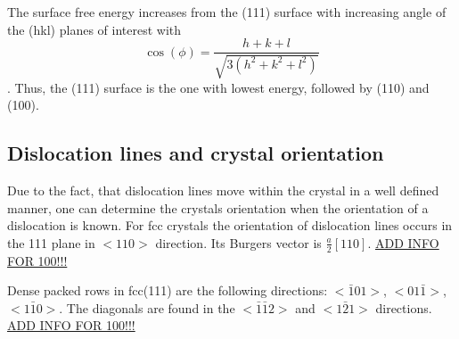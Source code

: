 The surface free energy increases from the (111) surface with increasing angle of the (hkl) planes of interest with $$\cos(\phi)=\frac{h+k+l}{\sqrt{3(h^2+k^2+l^2)}}$$ \cite{jian-min_calculation_2004}. Thus, the (111) surface is the one with lowest energy, followed by (110) and (100).

%

\subsection{Dislocation lines and crystal orientation}
Due to the fact, that dislocation lines move within the crystal in a well defined manner, one can determine the crystals orientation when the orientation of a dislocation is known.
For fcc crystals the orientation of dislocation lines occurs in the {111} plane in $<110>$ direction. Its Burgers vector is $\frac{a}{2}[110]$\cite{_dislocation-theory}. \underline{ADD INFO	FOR 100!!!}

 Dense packed rows in fcc(111) are the following directions: $<\bar 1 01>$, $<01\bar 1>$, $<1\bar 1 0>$. The diagonals are found in the $<\bar 1 \bar 1 2>$ and $<1\bar 2 1>$ directions. \underline{ADD INFO	FOR 100!!!}
 
